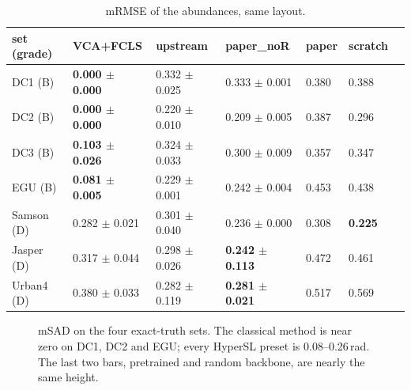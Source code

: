 \begin{table}[htbp]
\centering\small
\begin{tabular}{@{}lllllll@{}}
\toprule
set (grade) & VCA+FCLS & upstream & paper\_noR & paper & scratch \\
\midrule
DC1 (B) & \textbf{0.000 $\pm$ 0.000} & 0.332 $\pm$ 0.025 & 0.333 $\pm$ 0.001 & 0.380 & 0.388 \\
DC2 (B) & \textbf{0.000 $\pm$ 0.000} & 0.220 $\pm$ 0.010 & 0.209 $\pm$ 0.005 & 0.387 & 0.296 \\
DC3 (B) & \textbf{0.103 $\pm$ 0.026} & 0.324 $\pm$ 0.033 & 0.300 $\pm$ 0.009 & 0.357 & 0.347 \\
EGU (B) & \textbf{0.081 $\pm$ 0.005} & 0.229 $\pm$ 0.001 & 0.242 $\pm$ 0.004 & 0.453 & 0.438 \\
Samson (D) & 0.282 $\pm$ 0.021 & 0.301 $\pm$ 0.040 & 0.236 $\pm$ 0.000 & 0.308 & \textbf{0.225} \\
Jasper (D) & 0.317 $\pm$ 0.044 & 0.298 $\pm$ 0.026 & \textbf{0.242 $\pm$ 0.113} & 0.472 & 0.461 \\
Urban4 (D) & 0.380 $\pm$ 0.033 & 0.282 $\pm$ 0.119 & \textbf{0.281 $\pm$ 0.021} & 0.517 & 0.569 \\
\bottomrule
\end{tabular}
\caption{mRMSE of the abundances, same layout.}
\label{tab:hslunmix:mrmse}
\end{table}

\begin{figure}[htbp]
\centering
{}
\caption{mSAD on the four exact-truth sets. The classical method is near zero on DC1, DC2 and EGU; every HyperSL preset is
0.08--0.26\,rad. The last two bars, pretrained and random backbone, are nearly the same height.}
\label{fig:hslunmix:msad}
\end{figure}

